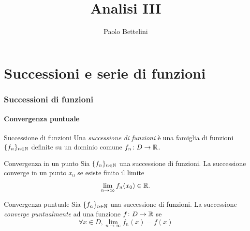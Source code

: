 \documentclass[a4paper]{article}
\title{Analisi III}
\author{Paolo Bettelini}
\date{}
\begin{document}
\maketitle
\tableofcontents


\pagebreak

\part{Successioni e serie di funzioni}

\section{Successioni di funzioni}

\subsection{Convergenza puntuale}

\begin{radioactive}
    \begin{snippetdefinition}{Successione di funzioni}
        Una \emph{successione di funzioni} è una famiglia di funzioni \(\{f_n\}_{n\in\mathbb{N}}\)
        definite su un dominio comune \(f_n \colon D \to \mathbb{R}\).
    \end{snippetdefinition}
\end{radioactive}

\begin{radioactive}
    \begin{snippetdefinition}{Convergenza in un punto}
        Sia \(\{f_n\}_{n\in\mathbb{N}}\) una successione di funzioni.
        La successione converge in un punto \(x_0\) se esiste finito il limite
        \[
            \lim_{n\to\infty} f_n(x_0) \in \mathbb{R}.
        \]
    \end{snippetdefinition}
\end{radioactive}

\begin{radioactive}
    \begin{snippetdefinition}{Convergenza puntuale}
        Sia \(\{f_n\}_{n\in\mathbb{N}}\) una successione di funzioni.
        La successione \emph{converge puntualmente} ad una funzione \(f\colon D \to \mathbb{R}\) se
        \[
            \forall x\in D, \lim_{n\to\infty} f_n(x) = f(x)
        \]
    \end{snippetdefinition}
\end{radioactive}
\end{document}

